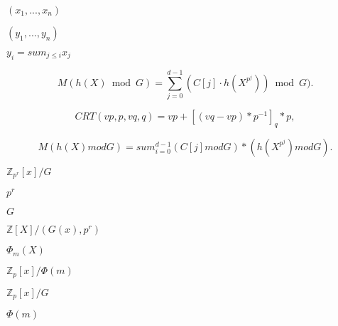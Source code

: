 \documentclass{article}
\begin{document}
$(x_1, ..., x_n)$
\pagebreak

$(y_1, ..., y_n)$
\pagebreak

$y_i = sum_{j\le i} x_j$
\pagebreak

\[ M(h(X) \bmod G)= \sum_{j=0}^{d-1}(C[j] \cdot h(X^{p^j}))\bmod G). \]
\pagebreak

\[ CRT(vp,p,vq,q) = vp + [(vq-vp) * p^{-1}]_q * p, \]
\pagebreak

\[ M(h(X) mod G) = sum_{i=0}^{d-1} (C[j] mod G) * (h(X^{p^j}) mod G).\]
\pagebreak

$\mathbb{Z}_{p^r}[x]/G$
\pagebreak

$p^r$
\pagebreak

$ G$
\pagebreak

$\mathbb{Z}[X]/(G(x),p^r)$
\pagebreak

$\Phi_m(X)$
\pagebreak

$\mathbb{Z}_p[x]/\Phi(m)$
\pagebreak

$\mathbb{Z}_p[x]/G$
\pagebreak

$\Phi(m)$
\pagebreak
\end{document}
